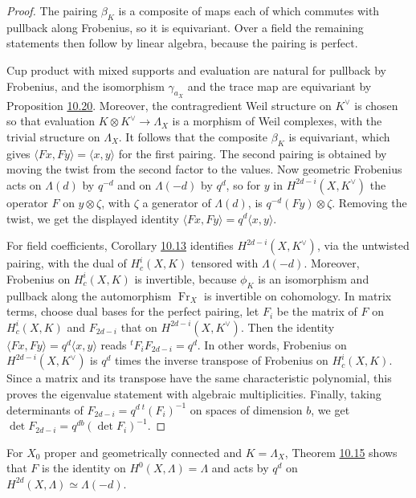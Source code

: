 \documentclass[11pt]{article}
\begin{document}
\begin{proof}[{Proof}]\label{bp166}%
The pairing \(\beta_K\) is a composite of maps each of which commutes with pullback along Frobenius, so it is equivariant. Over a field the remaining statements then follow by linear algebra, because the pairing is perfect.

Cup product with mixed supports and evaluation are natural for pullback by Frobenius, and the isomorphism \(\gamma_{a_X}\) and the trace map are equivariant by Proposition \hyperref[bp162]{10.20}. Moreover, the contragredient Weil structure on \(K^\vee\) is chosen so that evaluation \(K\otimes K^\vee\to\Lambda_X\) is a morphism of Weil complexes, with the trivial structure on \(\Lambda_X\). It follows that the composite \(\beta_K\) is equivariant, which gives \(\langle Fx,Fy\rangle=\langle
x,y\rangle\) for the first pairing. The second pairing is obtained by moving the twist from the second factor to the values. Now geometric Frobenius acts on \(\Lambda(d)\) by \(q^{-d}\) and on \(\Lambda(-d)\) by \(q^d\), so for \(y\) in \(H^{2d-i}(X,K^\vee)\) the operator \(F\) on \(y\otimes\zeta\), with \(\zeta\) a generator of \(\Lambda(d)\), is \(q^{-d}(Fy)\otimes\zeta\). Removing the twist, we get the displayed identity \(\langle Fx,Fy\rangle=q^d\langle x,y\rangle\).

For field coefficients, Corollary \hyperref[bp140]{10.13} identifies \(H^{2d-i}(X,K^\vee)\), via the untwisted pairing, with the dual of \(H_c^i(X,K)\) tensored with \(\Lambda(-d)\). Moreover, Frobenius on \(H_c^i(X,K)\) is invertible, because \(\phi_K\) is an isomorphism and pullback along the automorphism \(\operatorname{Fr}_X\) is invertible on cohomology. In matrix terms, choose dual bases for the perfect pairing, let \(F_i\) be the matrix of \(F\) on \(H^i_c(X,K)\) and \(F_{2d-i}\) that on \(H^{2d-i}(X,K^\vee)\). Then the identity \(\langle Fx,Fy\rangle=q^d\langle x,y\rangle\) reads \({}^tF_iF_{2d-i}=q^d\). In other words, Frobenius on \(H^{2d-i}(X,K^\vee)\) is \(q^d\) times the inverse transpose of Frobenius on \(H_c^i(X,K)\). Since a matrix and its transpose have the same characteristic polynomial, this proves the eigenvalue statement with algebraic multiplicities. Finally, taking determinants of \(F_{2d-i}=q^d\,{}^t(F_i)^{-1}\) on spaces of dimension \(b\), we get \(\det F_{2d-i}=q^{db}(\det F_i)^{-1}\).
\end{proof}

\label{bp167}%
For \(X_0\) proper and geometrically connected and \(K=\Lambda_X\), Theorem \hyperref[bp146]{10.15} shows that \(F\) is the identity on \(H^0(X,\Lambda)=\Lambda\) and acts by \(q^d\) on \(H^{2d}(X,\Lambda)\simeq\Lambda(-d)\).
\end{document}
